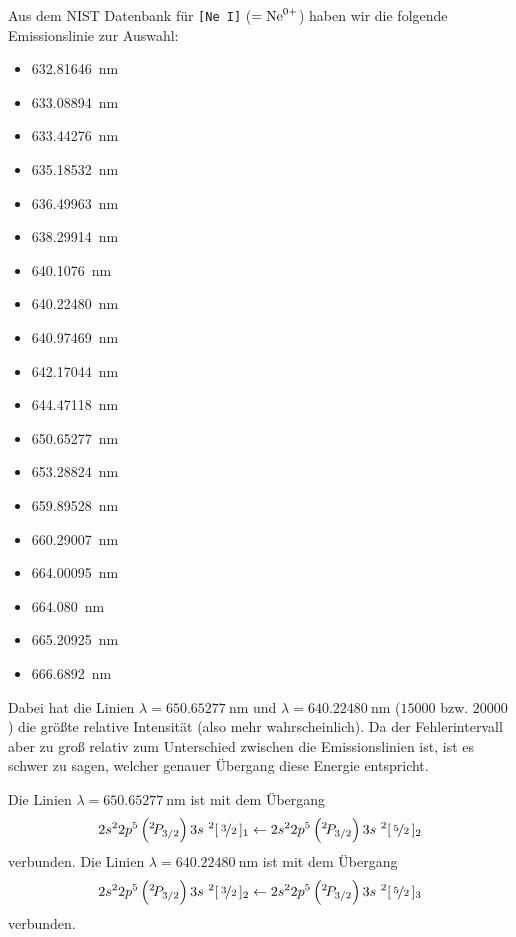 		Aus dem NIST Datenbank \citep{NIST_ASD} für \texttt{[Ne I]} ($= \ce{Ne^{0+}}$) haben wir die folgende Emissionslinie zur Auswahl: 
		\begin{multicols}{4}
			\begin{itemize}
				\item \SI{632.81646}{\nano\meter}
				\item \SI{633.08894}{\nano\meter}
				\item \SI{633.44276}{\nano\meter}
				\item \SI{635.18532}{\nano\meter}
				\item \SI{636.49963}{\nano\meter}
				\item \SI{638.29914}{\nano\meter}
				\item \SI{640.1076}{\nano\meter}
				\item \SI{640.22480}{\nano\meter}
				\item \SI{640.97469}{\nano\meter}
				\item \SI{642.17044}{\nano\meter}
				\item \SI{644.47118}{\nano\meter}
				\item \SI{650.65277}{\nano\meter}
				\item \SI{653.28824}{\nano\meter}
				\item \SI{659.89528}{\nano\meter}
				\item \SI{660.29007}{\nano\meter}
				\item \SI{664.00095}{\nano\meter}
				\item \SI{664.080}{\nano\meter}
				\item \SI{665.20925}{\nano\meter}
				\item \SI{666.6892}{\nano\meter}
 			\end{itemize}
		\end{multicols}
		Dabei hat die Linien $\lambda = \SI{650.65277}{\nano\meter}$ und $\lambda = \SI{640.22480}{\nano\meter}$ ($15000$ bzw. $20000$) die größte relative Intensität (also mehr wahrscheinlich). Da der Fehlerintervall aber zu groß relativ zum Unterschied zwischen die Emissionslinien ist, ist es schwer zu sagen, welcher genauer Übergang diese Energie entspricht.

		Die Linien $\lambda = \SI{650.65277}{\nano\meter}$ ist mit dem Übergang $$2s^22p^5\left(^2\!P_{3/2}\right)3s~^2[\,\nicefrac{3}{2}\,]_1 \leftarrow 2s^22p^5\left(^2\!P_{3/2}\right)3s~^2[\,\nicefrac{5}{2}\,]_2$$ verbunden.
		Die Linien $\lambda = \SI{640.22480}{\nano\meter}$ ist mit dem Übergang $$2s^22p^5\left(^2\!P_{3/2}\right)3s~^2[\,\nicefrac{3}{2}\,]_2 \leftarrow 2s^22p^5\left(^2\!P_{3/2}\right)3s~^2[\,\nicefrac{5}{2}\,]_3$$ verbunden.

